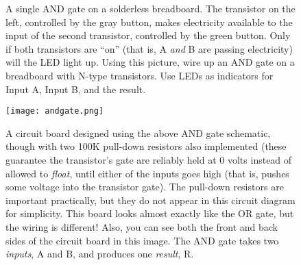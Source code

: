 \begin{figure}[!ht]
\begin{center}
\medskip

\caption{A single AND gate on a solderless breadboard. The transistor on the left, controlled by the gray button, makes electricity available to the input of the second transistor, controlled by the green button. Only if both transistors are ``on'' (that is, A \emph{and} B are passing electricity) will the LED light up. Using this picture, wire up an AND gate on a breadboard with N-type transistors. Use LEDs as indicators for Input A, Input B, and the result.}
\end{center}
\end{figure}




\begin{figure}[!ht]
\begin{center}
\texttt{[image: andgate.png]}
\caption{A circuit board designed using the above AND gate schematic, though with two 100K pull-down resistors also implemented (these guarantee the transistor's gate are reliably held at 0 volts instead of allowed to \emph{float}, until either of the inputs goes high (that is, pushes some voltage into the transistor gate). The pull-down resistors are important practically, but they do not appear in this circuit diagram for simplicity. This board looks almost exactly like the OR gate, but the wiring is different! Also, you can see both the front and back sides of the circuit board in this image. The AND gate takes two \emph{inputs}, A and B, and produces one \emph{result}, R.}
\end{center}
\label{fig:andgate}
\end{figure}
